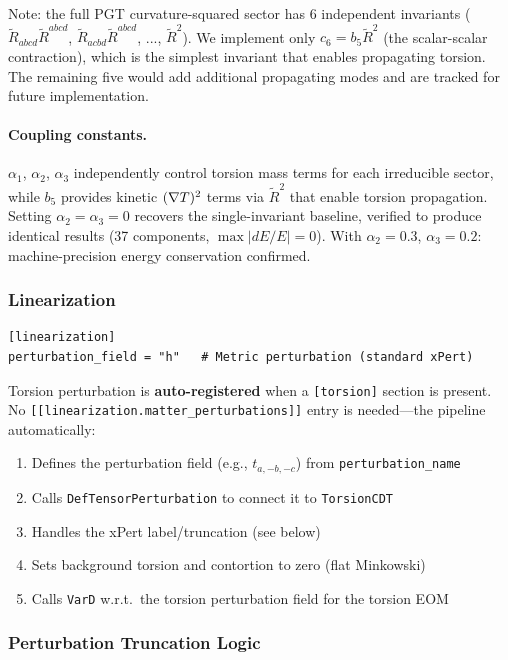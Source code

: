 Note: the full PGT curvature-squared sector has 6 independent invariants ($\tilde{R}_{abcd}\tilde{R}^{abcd}$, $\tilde{R}_{acbd}\tilde{R}^{abcd}$, ..., $\tilde{R}^2$).  We implement only $c_6 = b_5 \tilde{R}^2$ (the scalar-scalar contraction), which is the simplest invariant that enables propagating torsion.  The remaining five would add additional propagating modes and are tracked for future implementation.

\paragraph{Coupling constants.}
$\alpha_1$, $\alpha_2$, $\alpha_3$ independently control torsion mass terms for each irreducible sector, while $b_5$ provides kinetic $(\nabla T)^2$ terms via $\tilde{R}^2$ that enable torsion propagation.  Setting $\alpha_2 = \alpha_3 = 0$ recovers the single-invariant baseline, verified to produce identical results (37 components, $\max|dE/E| = 0$).  With $\alpha_2 = 0.3$, $\alpha_3 = 0.2$: machine-precision energy conservation confirmed.

\subsubsection{Linearization}
\label{sec:torsion-linearization}

\begin{lstlisting}[style=toml]
[linearization]
perturbation_field = "h"   # Metric perturbation (standard xPert)
\end{lstlisting}

Torsion perturbation is \textbf{auto-registered} when a \texttt{[torsion]} section is present. No \texttt{[[linearization.matter\_perturbations]]} entry is needed---the pipeline automatically:
\begin{enumerate}
  \item Defines the perturbation field (e.g., $t_{a,-b,-c}$) from \texttt{perturbation\_name}
  \item Calls \texttt{DefTensorPerturbation} to connect it to \texttt{TorsionCDT}
  \item Handles the xPert label/truncation (see below)
  \item Sets background torsion and contortion to zero (flat Minkowski)
  \item Calls \texttt{VarD} w.r.t.\ the torsion perturbation field for the torsion EOM
\end{enumerate}

\subsubsection{Perturbation Truncation Logic}
\label{sec:perturbation-truncation}

